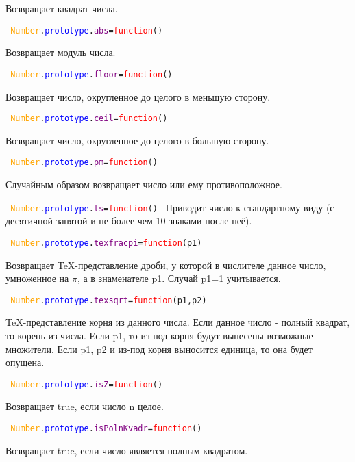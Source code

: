 Возвращает квадрат числа.

\texttt{
	\textcolor{Orange}{Number}.\textcolor{Blue}{prototype}.\textcolor{Purple}{abs}=\textcolor{Red}{function}()
}

Возвращает модуль числа.

\texttt{
	\textcolor{Orange}{Number}.\textcolor{Blue}{prototype}.\textcolor{Purple}{floor}=\textcolor{Red}{function}()
}

Возвращает число, округленное до целого в меньшую сторону.

\texttt{
	\textcolor{Orange}{Number}.\textcolor{Blue}{prototype}.\textcolor{Purple}{ceil}=\textcolor{Red}{function}()
}

Возвращает число, округленное до целого в большую сторону.

\texttt{
	\textcolor{Orange}{Number}.\textcolor{Blue}{prototype}.\textcolor{Purple}{pm}=\textcolor{Red}{function}()
}

Случайным образом возвращает число или ему противоположное.

\texttt{
	\textcolor{Orange}{Number}.\textcolor{Blue}{prototype}.\textcolor{Purple}{ts}=\textcolor{Red}{function}()
}
Приводит число к стандартному виду (с десятичной запятой и не более чем 10 знаками после неё).

\texttt{
	\textcolor{Orange}{Number}.\textcolor{Blue}{prototype}.\textcolor{Purple}{texfracpi}=\textcolor{Red}{function}(p1)
}

Возвращает TeX-представление дроби, у которой в числителе данное число, умноженное на $\pi$, а в знаменателе p1.
Случай p1=1 учитывается.

\texttt{
	\textcolor{Orange}{Number}.\textcolor{Blue}{prototype}.\textcolor{Purple}{texsqrt}=\textcolor{Red}{function}(p1,p2)
}

TeX-представление корня из данного числа.
Если данное число - полный квадрат, то корень из числа.
Если p1, то из-под корня будут вынесены возможные множители.
Если p1, p2 и из-под корня выносится единица, то она будет опущена.

\texttt{
	\textcolor{Orange}{Number}.\textcolor{Blue}{prototype}.\textcolor{Purple}{isZ}=\textcolor{Red}{function}()
}

Возвращает true, если число n целое.

\texttt{
	\textcolor{Orange}{Number}.\textcolor{Blue}{prototype}.\textcolor{Purple}{isPolnKvadr}=\textcolor{Red}{function}()
}

Возвращает true, если число является полным квадратом.

